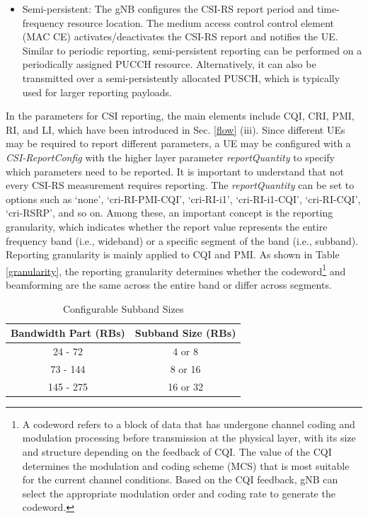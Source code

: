\documentclass[lettersize,journal]{IEEEtran}
\begin{document}
\begin{appendices}
\begin{itemize}
    \item Semi-persistent: The gNB configures the CSI-RS report period and time-frequency resource location. The medium access control control element (MAC CE) activates/deactivates the CSI-RS report and notifies the UE. Similar to periodic reporting, semi-persistent reporting can be performed on a periodically assigned PUCCH resource. Alternatively, it can also be transmitted over a semi-persistently allocated PUSCH, which is typically used for larger reporting payloads.
\end{itemize}

In the parameters for CSI reporting, the main elements include CQI, CRI, PMI, RI, and LI, which have been introduced in Sec. \ref{flow} (iii). Since different UEs may be required to report different parameters, a UE may be configured with a \emph{CSI-ReportConfig} with the higher layer parameter \emph{reportQuantity} to specify which parameters need to be reported. It is important to understand that not every CSI-RS measurement requires reporting. The \emph{reportQuantity} can be set to options such as `none', `cri-RI-PMI-CQI', `cri-RI-i1', `cri-RI-i1-CQI', `cri-RI-CQI', `cri-RSRP', and so on. Among these, an important concept is the reporting granularity, which indicates whether the report value represents the entire frequency band (i.e., wideband) or a specific segment of the band (i.e., subband). Reporting granularity is mainly applied to CQI and PMI. As shown in Table \ref{granularity}, the  reporting granularity determines whether the codeword\footnote{A codeword refers to a block of data that has undergone channel coding and modulation processing before transmission at the physical layer, with its size and structure depending on the feedback of CQI. The value of the CQI determines the modulation and coding scheme (MCS) that is most suitable for the current channel conditions. Based on the CQI feedback, gNB can select the appropriate modulation order and coding rate to generate the codeword.} and beamforming are the same across the entire band or differ across segments.

\begin{table}[t]   
\begin{center} 
\centering  
\captionsetup{
  labelsep=newline, %
}
\renewcommand{\arraystretch}{2}  %
\caption{Configurable Subband Sizes}\label{tabCSS}
\begin{tabular}{|c|c|}   
\hline  
\rowcolor{gray!20}
\bf{Bandwidth Part (RBs)} &\bf{Subband Size (RBs)}  \\
\hline  24 - 72 &4 or 8\\
\hline  73 - 144&8 or 16\\
\hline  145 - 275&16 or 32\\
\hline
\end{tabular}   
\end{center}   
\vspace{-10pt}
\end{table}


\end{appendices}
\end{document}
